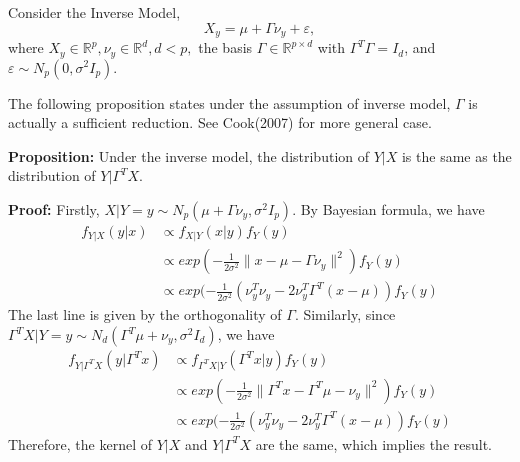 \documentclass{article}
\begin{document}
Consider the Inverse Model, 
\begin{equation*}
X_{y} = \mu + \Gamma\nu_{y}+ \varepsilon,
\end{equation*}
where $X_{y}\in\mathbb{R}^{p},\nu_{y}\in\mathbb{R}^{d},d<p,$ the basis $\Gamma\in\mathbb{R}^{p\times d}$ with $\Gamma^{T}\Gamma=I_{d}$, and $\varepsilon\sim N_{p}(0,\sigma^2I_{p}).$

The following proposition states under the assumption of inverse model, $\Gamma$ is actually a sufficient reduction. See Cook(2007) for more general case.

\textbf{Proposition:} Under the inverse model, the distribution of $Y|X$ is the same as the distribution of $Y|\Gamma^{T}X$.

\textbf{Proof:} Firstly, $X|Y=y\sim N_{p}(\mu+\Gamma\nu_{y},\sigma^2I_{p})$. By Bayesian formula, we have
\begin{align*}
f_{Y|X}(y|x) &\propto f_{X|Y}(x|y)f_{Y}(y)\\
 		   &\propto exp(-\frac{1}{2\sigma^2}\|x-\mu-\Gamma\nu_{y}\|^{2})f_{Y}(y)\\
		   &\propto exp(-\frac{1}{2\sigma^2}(\nu_{y}^{T}\nu_{y}-2\nu_{y}^{T}\Gamma^{T}(x-\mu))f_{Y}(y)
\end{align*}
The last line is given by the orthogonality of $\Gamma$. Similarly,
since $\Gamma^{T}X|Y=y\sim N_{d}(\Gamma^{T}\mu + \nu_{y},\sigma^2I_{d})$, we have
\begin{align*}
f_{Y|\Gamma^{T}X}(y|\Gamma^{T}x) &\propto f_{\Gamma^{T}X|Y}(\Gamma^{T}x|y)f_{Y}(y)\\
			&\propto exp(-\frac{1}{2\sigma^2}\|\Gamma^{T}x-\Gamma^{T}\mu-\nu_{y}\|^{2})f_{Y}(y)\\
			&\propto exp(-\frac{1}{2\sigma^2}(\nu_{y}^{T}\nu_{y}-2\nu_{y}^{T}\Gamma^{T}(x-\mu))f_{Y}(y)
\end{align*}
Therefore, the kernel of $Y|X$ and $Y|\Gamma^{T}X$ are the same, which implies the result.
\end{document}
